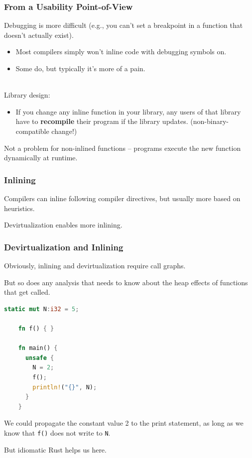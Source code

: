 \begin{frame}
  \frametitle{From a Usability Point-of-View}

  
  Debugging is more difficult (e.g., you can't set a breakpoint in a function that
  doesn't actually exist).
  \begin{itemize}
    \item Most compilers simply won't inline code with debugging symbols on.
    \item Some do, but typically it's more of a pain.
  \end{itemize}~\\[1em]

  Library design:
  \begin{itemize}
    \item If you change any inline function in your library, any users
      of that library have to {\bf recompile} their program if the
      library updates. (non-binary-compatible change!)
  \end{itemize}
  Not a problem for non-inlined functions -- programs execute the new function
      dynamically at runtime.

  
\end{frame}


\begin{frame}
\frametitle{Inlining}

 Compilers can inline following compiler directives, but usually more based on heuristics. 
 
 Devirtualization enables more inlining. 
 

\end{frame}

\begin{frame}[fragile]
\frametitle{Devirtualization and Inlining}

Obviously, inlining and devirtualization require call graphs. 

But so
does any analysis that needs to know about the heap effects of
functions that get called.


{\small
\begin{lstlisting}[language=Rust]
    static mut N:i32 = 5;

    fn f() { }

    fn main() {
      unsafe { 
        N = 2;
        f();
        println!("{}", N);  
      }
    }
    \end{lstlisting}
}

We could propagate the constant value 2 to the print statement,
as long as we know that {\tt f()} does not write to {\tt N}.

But idiomatic Rust helps us here.

\end{frame}

